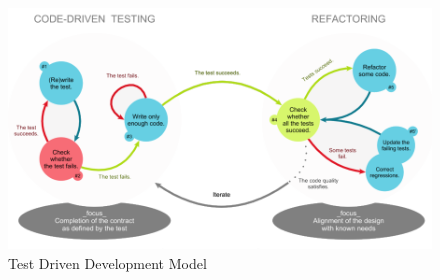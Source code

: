 \begin{figure}[H]
\begin{center}
	\includegraphics[width = 5.7in]{images/testdrivendevelopment.png}
	\caption{Test Driven Development Model} %
\end{center}
\end{figure}

